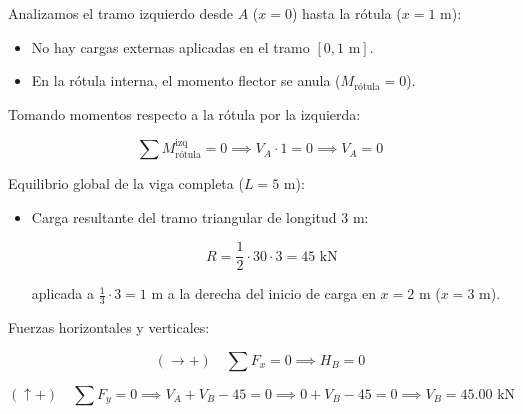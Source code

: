 


Analizamos el tramo izquierdo desde $A$ ($x=0$) hasta la rótula ($x=1\text{ m}$):

\begin{itemize}

    \item No hay cargas externas aplicadas en el tramo $[0, 1\text{ m}]$.

    \item En la rótula interna, el momento flector se anula ($M_{\text{rótula}} = 0$).

\end{itemize}

Tomando momentos respecto a la rótula por la izquierda:

\begin{equation}

    \sum M_{\text{rótula}}^{\text{izq}} = 0 \implies V_A \cdot 1 = 0 \implies \boxed{V_A = 0}

\end{equation}



Equilibrio global de la viga completa ($L = 5\text{ m}$):

\begin{itemize}

    \item Carga resultante del tramo triangular de longitud $3\text{ m}$:

          \[

              R = \frac{1}{2} \cdot 30 \cdot 3 = 45\text{ kN}

          \]

          aplicada a $\frac{1}{3} \cdot 3 = 1\text{ m}$ a la derecha del inicio de carga en $x=2\text{ m}$ ($x = 3\text{ m}$).

\end{itemize}



Fuerzas horizontales y verticales:

\begin{equation}

    (\rightarrow +) \quad \sum F_x = 0 \implies \boxed{H_B = 0}

\end{equation}

\begin{equation}

    (\uparrow +) \quad \sum F_y = 0 \implies V_A + V_B - 45 = 0 \implies 0 + V_B - 45 = 0 \implies \boxed{V_B = 45.00\text{ kN}}

\end{equation}



